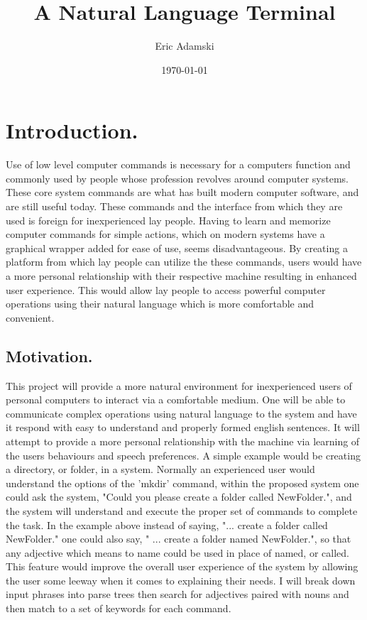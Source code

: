 \documentclass[12pt]{article}
\title{A Natural Language Terminal}
\author{Eric Adamski}
\date{\today}
\begin{document}
\maketitle

\section{Introduction.}

Use of low level computer commands is necessary for a computers function and commonly used by people whose profession revolves around computer systems. These core system commands are what has built modern computer software, and are still useful today. These commands and the interface from which they are used is foreign for inexperienced lay people. Having to learn and memorize computer commands for simple actions, which on modern systems have a graphical wrapper added for ease of use, seems disadvantageous. By creating a platform from which lay people can utilize the these commands, users would have a more personal relationship with their respective machine resulting in enhanced user experience. This would allow lay people to access powerful computer operations using their natural language which is more comfortable and convenient.

\subsection{Motivation.}

This project will provide a more natural environment for inexperienced users of personal computers to interact via a comfortable medium. One will be able to communicate complex operations using natural language to the system and have it respond with easy to understand and properly formed english sentences. It will attempt to provide a more personal relationship with the machine via learning of the users behaviours and speech preferences.\cite{ogden} A simple example would be creating a directory, or folder, in a system. Normally an experienced user would understand the options of the 'mkdir' command, within the proposed system one could ask the system, "Could you please create a folder called NewFolder.", and the system will understand and execute the proper set of commands to complete the task. In the example above instead of saying, "... create a folder called NewFolder." one could also say, " ... create a folder named NewFolder.", so that any adjective which means to name could be used in place of named, or called. This feature would improve the overall user experience of the system by allowing the user some leeway when it comes to explaining their needs.\cite{kelly} I will break down input phrases into parse trees then search for adjectives paired with nouns and then match to a set of keywords for each command.
\end{document}
